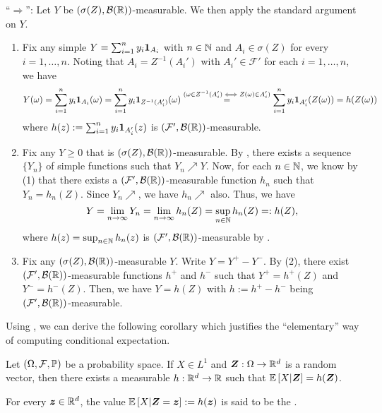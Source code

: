 \begin{enumerate}
\begin{pf}
``\(\Rightarrow\)'': Let \(Y\) be \((\sigma(Z),\mathcal{B}(\mathbb{R}))\)-measurable.
We then apply the standard argument on \(Y\).
\begin{enumerate}[label={(\arabic*)}]
\item Fix any simple \(Y=\sum_{i=1}^{n}y_i\mathbf{1}_{A_i}\) with \(n\in\mathbb{N}\) and
\(A_i\in\sigma(Z)\) for every \(i=1,\dotsc,n\). Noting that \(A_i=Z^{-1}(A_i')\)
with \(A_i'\in\mathcal{F}'\) for each \(i=1,\dotsc,n\), we have
\[
Y(\omega)=\sum_{i=1}^{n}y_i\mathbf{1}_{A_i}(\omega)
=\sum_{i=1}^{n}y_i\mathbf{1}_{Z^{-1}(A_i')}(\omega)
\overset{(\omega\in Z^{-1}(A_i')\iff Z(\omega)\in A_i')}
{=}\sum_{i=1}^{n}y_i\mathbf{1}_{A_i'}(Z(\omega))
=h(Z(\omega))
\]
where \(h(z):=\sum_{i=1}^{n}y_i\mathbf{1}_{A_i'}(z)\) is
\((\mathcal{F}',\mathcal{B}(\mathbb{R}))\)-measurable.
\item Fix any \(Y\ge 0\) that is \((\sigma(Z),\mathcal{B}(\mathbb{R}))\)-measurable.
By , there exists a sequence \(\{Y_n\}\) of simple functions
such that \(Y_n\nearrow Y\). Now, for each \(n\in\mathbb{N}\), we know by (1) that
there exists a \((\mathcal{F}',\mathcal{B}(\mathbb{R}))\)-measurable function \(h_n\)
such that \(Y_n=h_n(Z)\). Since \(Y_n\nearrow\), we have \(h_n\nearrow\) also.
Thus, we have
\[
Y=\lim_{n\to\infty}Y_n=\lim_{n\to\infty}h_n(Z)=\sup_{n\in\mathbb{N}}h_n(Z)=:h(Z),
\]
where \(h(z)=\sup_{n\in\mathbb{N}}h_n(z)\) is
\((\mathcal{F}',\mathcal{B}(\mathbb{R}))\)-measurable by .
\item Fix any \((\sigma(Z),\mathcal{B}(\mathbb{R}))\)-measurable \(Y\). Write
\(Y=Y^{+}-Y^{-}\). By (2), there exist
\((\mathcal{F}',\mathcal{B}(\mathbb{R}))\)-measurable functions \(h^{+}\) and \(h^{-}\)
such that \(Y^{+}=h^{+}(Z)\) and \(Y^{-}=h^{-}(Z)\). Then, we have \(Y=h(Z)\)
with \(h:=h^{+}-h^{-}\) being \((\mathcal{F}',\mathcal{B}(\mathbb{R}))\)-measurable.
\end{enumerate}
\end{pf}

Using , we can derive the following corollary which
justifies the ``elementary'' way of computing conditional expectation.
\begin{corollary}
\label{cor:fact-cond-exp}
Let \((\Omega,\mathcal{F},\mathbb{P})\) be a probability space. If \(X\in L^{1}\) and
\(\bm{Z}:\Omega\to\mathbb{R}^{d}\) is a random vector, then there
exists a measurable \(h:\mathbb{R}^{d}\to\mathbb{R}\) such that
\(\mathbb{E}\left[X|\bm{Z}\right]=h(\bm{Z})\).
\end{corollary}
\begin{note}
For every \(\bm{z}\in\mathbb{R}^{d}\), the value \(\mathbb{E}\left[X|\bm{Z}=\bm{z}\right]:=h(\bm{z})\)
is said to be the .
\end{note}


\end{enumerate}
